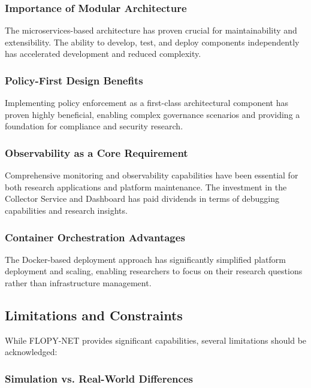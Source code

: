 \subsubsection{Importance of Modular Architecture}

The microservices-based architecture has proven crucial for maintainability and extensibility. The ability to develop, test, and deploy components independently has accelerated development and reduced complexity.

\subsubsection{Policy-First Design Benefits}

Implementing policy enforcement as a first-class architectural component has proven highly beneficial, enabling complex governance scenarios and providing a foundation for compliance and security research.

\subsubsection{Observability as a Core Requirement}

Comprehensive monitoring and observability capabilities have been essential for both research applications and platform maintenance. The investment in the Collector Service and Dashboard has paid dividends in terms of debugging capabilities and research insights.

\subsubsection{Container Orchestration Advantages}

The Docker-based deployment approach has significantly simplified platform deployment and scaling, enabling researchers to focus on their research questions rather than infrastructure management.

\subsection{Limitations and Constraints}

While FLOPY-NET provides significant capabilities, several limitations should be acknowledged:

\subsubsection{Simulation vs. Real-World Differences}

